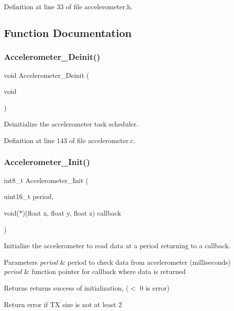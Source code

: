 Definition at line 33 of file accelerometer.\+h.



\subsection{Function Documentation}
\mbox{\label{group__accelerometer_gae22be8908e6faff9d8ea3e54adfb31f0}} 
\subsubsection{\texorpdfstring{Accelerometer\_Deinit()}{Accelerometer\_Deinit()}}
{\footnotesize\ttfamily void Accelerometer\+\_\+\+Deinit (\begin{DoxyParamCaption}\item[{void}]{ }\end{DoxyParamCaption})}



Deinitialize the accelerometer task scheduler. 



Definition at line 143 of file accelerometer.\+c.

\mbox{\label{group__accelerometer_gabb5dc31f52b4c94babb890afe85fdc29}} 
\subsubsection{\texorpdfstring{Accelerometer\_Init()}{Accelerometer\_Init()}}
{\footnotesize\ttfamily int8\+\_\+t Accelerometer\+\_\+\+Init (\begin{DoxyParamCaption}\item[{uint16\+\_\+t}]{period,  }\item[{void($\ast$)(float x, float y, float z)}]{callback }\end{DoxyParamCaption})}



Initialize the accelerometer to read data at a period returning to a callback. 


\begin{DoxyParams}{Parameters}
{\em period} & period to check data from accelerometer (milliseconds) \\
\hline
{\em period} & function pointer for callback where data is returned \\
\hline
\end{DoxyParams}
\begin{DoxyReturn}{Returns}
returns success of initialization, ($<$ 0 is error) 
\end{DoxyReturn}
Return error if TX size is not at least 2

